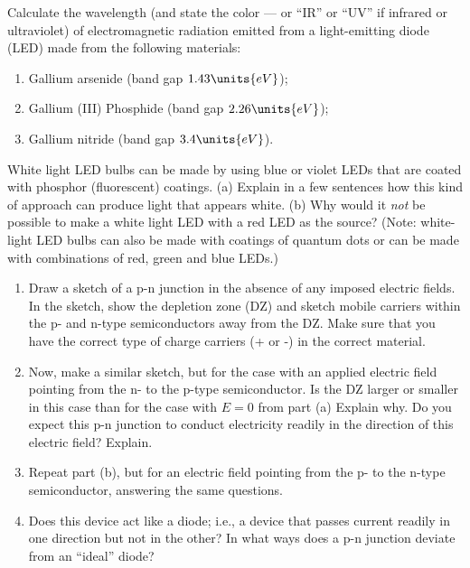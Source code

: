 
\begin{problem}
Calculate the wavelength (and state the color --- or ``IR'' or
``UV'' if infrared or ultraviolet) of electromagnetic radiation 
emitted from a light-emitting diode (LED) made from the
following materials: 
\begin{enumerate}
\item Gallium arsenide (band gap $1.43\units{eV}$);
\item Gallium (III) Phosphide (band gap $2.26 \units{eV}$); 
\item Gallium nitride (band gap $3.4\units{eV}$).
\end{enumerate}
\end{problem}


\begin{problem}
White light LED bulbs can be made by using blue or violet LEDs
that are coated with phosphor (fluorescent) coatings. (a) Explain
in a few sentences how this kind of approach can produce light that
appears white. (b) Why would it {\it not} be possible to make a
white light LED with a red LED as the source? (Note: white-light
LED bulbs can also be made with coatings of quantum dots or can be 
made with combinations of red, green and blue LEDs.)
\end{problem}

\newpage


\begin{problem}
\begin{enumerate}
\item Draw a sketch of a p-n junction in the absence of any imposed
electric fields. In the sketch, show the depletion zone (DZ) and
sketch mobile carriers within the p- and n-type semiconductors
away from the DZ. Make sure that you have the correct type of
charge carriers (+ or -) in the correct material.
\item Now, make a similar sketch, but for the case with an applied
electric field pointing from the n- to the p-type semiconductor.
Is the DZ larger or smaller in this case than for the case with 
$E = 0$ from part (a) Explain why. Do you expect this p-n junction
to conduct electricity readily in the direction of this electric
field? Explain.
\item Repeat part (b), but for an electric field pointing from the p-
to the n-type semiconductor, answering the same questions.
\item Does this device act like a diode; i.e., a device that passes
current readily in one direction but not in the other? In what ways does
a p-n junction deviate from an ``ideal'' diode?
\end{enumerate}
\end{problem}

